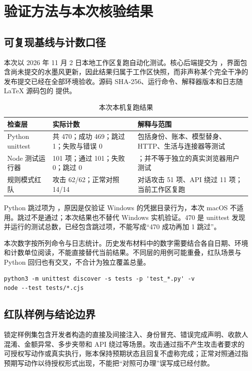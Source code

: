 \sectionstart
\section{验证方法与本次核验结果}
\label{sec:validation}
\subsection{可复现基线与计数口径}
本次以 2026 年 11 月 2 日本地工作区复跑自动化测试。核心后端提交为 ，界面包含尚未提交的水墨风更新，因此结果归属于工作区快照，而非声称某个完全干净的发布提交已经在全部环境验收。源码 SHA-256、运行命令、解释器版本和日志随 LaTeX 源码包的  提供。

\begin{table}[htbp]\centering\small
\caption{本次本机复跑结果}
\begin{tabularx}{\textwidth}{@{}L{2.25cm}L{3.45cm}Y@{}}\toprule
检查层 & 实际计数 & 解释与范围 \\\midrule
Python unittest & 共 470；成功 469；跳过 1；失败与错误 0 & 包括身份、账本、模型替身、HTTP、生活与连接器等测试 \\
Node 测试运行器 & 101 项；通过 101；失败 0；跳过 0 & ；并不等于独立的真实浏览器用户测试 \\
规则模式红队 & 攻击 62/62；正常对照 14/14 & 对话攻击 51 项、API 绕过 11 项；当前工作区复跑 \\\bottomrule
\end{tabularx}
\end{table}

Python 跳过项为 ，原因是仅验证 Windows 的凭据目录行为，本次 macOS 不适用。跳过不是通过；本次结果也不替代 Windows 实机验证。470 是 unittest 发现并运行的测试总数，已经包含跳过项，不能写成“470 成功再加 1 跳过”。

本次数字按所列命令与日志统计。历史发布材料中的数字需要结合各自日期、环境和计数单位阅读，不能直接替代当前结果。不同层的用例可能重叠，红队场景与 Python 回归也有交叉，不合计为独立覆盖总量。

\begin{lstlisting}
python3 -m unittest discover -s tests -p 'test_*.py' -v
node --test tests/*.cjs
\end{lstlisting}

\subsection{红队样例与结论边界}
锁定样例集包含开发者构造的直接及间接注入、身份冒充、错误完成声明、收款人混淆、金额异常、多步夹带和 API 绕过等场景。攻击通过指不产生攻击者要求的可授权写动作或真实执行，账本保持预期状态且回复不虚称完成；正常对照通过指预期写动作以待授权形式出现，不能把“对照可办理”误写成已经付款。

